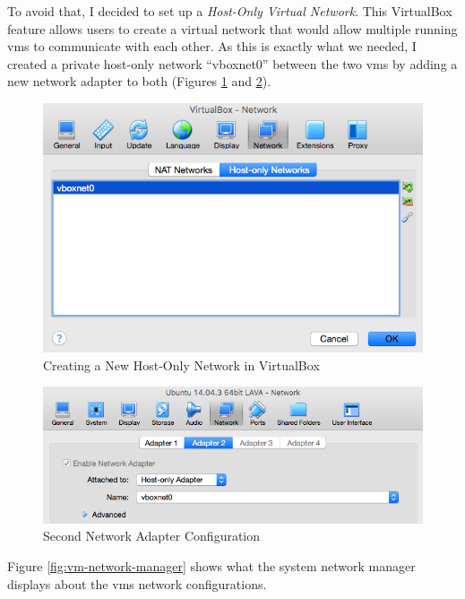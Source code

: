 To avoid that, I decided to set up a \emph{Host-Only Virtual Network}. This VirtualBox feature allows users to create a virtual network that would allow multiple running \glspl{vm} to communicate with each other. As this is exactly what we needed, I created a private host-only network ``vboxnet0'' between the two \glspl{vm} by adding a new network adapter to both (Figures \ref{fig:virtualbox-host-only-network} and \ref{fig:vm-network-adapter}).

\begin{figure}[ht]
    \centering
    \includegraphics[scale=0.65]{figures/virtualbox-host-only-network}
    \caption{Creating a New Host-Only Network in VirtualBox}
    \label{fig:virtualbox-host-only-network}
\end{figure}

\begin{figure}[ht]
    \centering
    \includegraphics[scale=0.65]{figures/vm-network-adapter}
    \caption{Second Network Adapter Configuration}
    \label{fig:vm-network-adapter}
\end{figure}

\clearpage

Figure \ref{fig:vm-network-manager} shows what the system network manager displays about the \glspl{vm} network configurations.

